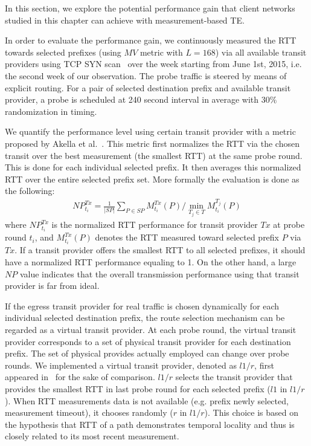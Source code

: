 In this section, we explore the potential performance gain that client networks studied in this chapter can achieve with measurement-based TE.

In order to evaluate the performance gain, we continuously measured the \acf{RTT} towards selected prefixes (using $MV$ metric with $L=168$) via all available transit providers using TCP SYN scan~\cite{nmap} over the week starting from June 1st, 2015, i.e. the second week of our observation.
The probe traffic is steered by means of explicit routing.
For a pair of selected destination prefix and available transit provider, a probe is scheduled at 240 second interval in average with $30\%$ randomization in timing. 

We quantify the performance level using certain transit provider with a metric proposed by Akella et al.\ \cite{Akella2003a}. 
This metric first normalizes the RTT via the chosen transit over the best measurement (the smallest RTT) at the same probe round. This is done for each individual selected prefix.
It then averages this normalized RTT over the entire selected prefix set.
More formally the evaluation is done as the following:
\begin{align*}
NP^{Tx}_{t_i} = \frac{1}{|SP|} \sum_{P \in SP} M^{Tx}_{t_i}(P)/\min_{T_j \in T}M^{T_j}_{t_i}(P)
\label{eq:np}
\end{align*}
where $NP^{Tx}_{t_i}$ is the normalized RTT performance for transit provider $Tx$ at probe round $t_i$, and 
$M^{Tx}_{t_i}(P)$ denotes the RTT measured toward selected prefix $P$ via $Tx$.
If a transit provider offers the smallest RTT to all selected prefixes, it should have a normalized RTT performance equaling to 1. On the other hand, a large $NP$ value indicates that the overall transmission performance  using that transit provider is far from ideal.

If the egress transit provider for real traffic is chosen dynamically for each individual selected destination prefix, the route selection mechanism can be regarded as a virtual transit provider. At each probe round, the virtual transit provider corresponds to a set of physical transit provider for each destination prefix. The set of physical provides actually employed can change over probe rounds.
We implemented a virtual transit provider, denoted as $l1/r$, first appeared in~\cite{Akella2008} for the sake of comparison. 
$l1/r$ selects the transit provider that provides the smallest RTT in last probe round for each selected prefix ($l1$ in $l1/r$). When RTT measurements data is not available (e.g. prefix newly selected, measurement timeout), it chooses randomly ($r$ in $l1/r$). This choice is based on the hypothesis that RTT of a path demonstrates temporal locality and thus is closely related to its most recent measurement.

